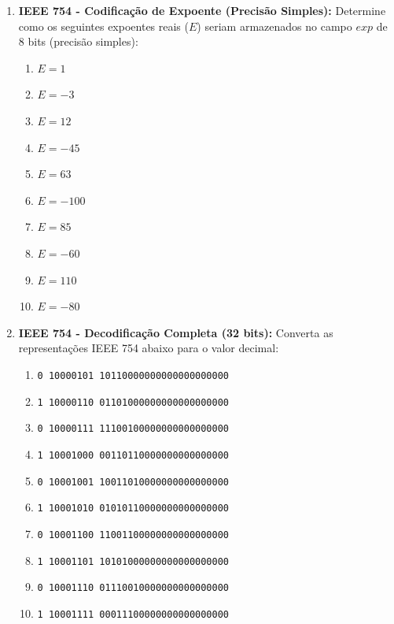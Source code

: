 \begin{enumerate}
    \item \textbf{IEEE 754 - Codificação de Expoente (Precisão Simples):}
          Determine como os seguintes expoentes reais ($E$) seriam armazenados no campo $exp$ de 8 bits (precisão simples):
          \begin{enumerate}
              \item $E = 1$
              \item $E = -3$
              \item $E = 12$
              \item $E = -45$
              \item $E = 63$
              \item $E = -100$
              \item $E = 85$
              \item $E = -60$
              \item $E = 110$
              \item $E = -80$
          \end{enumerate}

    \item \textbf{IEEE 754 - Decodificação Completa (32 bits):}
          Converta as representações IEEE 754 abaixo para o valor decimal:
          \begin{enumerate}
              \item \texttt{0 10000101 10110000000000000000000}
              \item \texttt{1 10000110 01101000000000000000000}
              \item \texttt{0 10000111 11100100000000000000000}
              \item \texttt{1 10001000 00110110000000000000000}
              \item \texttt{0 10001001 10011010000000000000000}
              \item \texttt{1 10001010 01010110000000000000000}
              \item \texttt{0 10001100 11001100000000000000000}
              \item \texttt{1 10001101 10101000000000000000000}
              \item \texttt{0 10001110 01110010000000000000000}
              \item \texttt{1 10001111 00011100000000000000000}
          \end{enumerate}


\end{enumerate}
